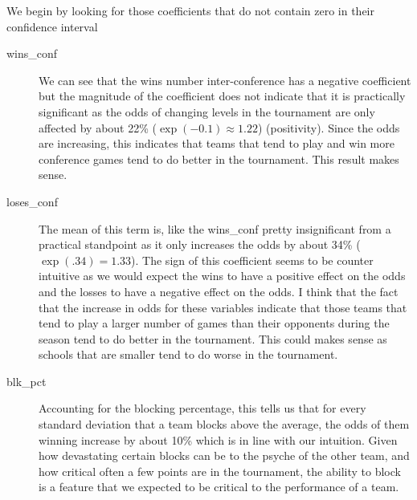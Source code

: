 \documentclass[10pt,a4paper, hidelinks]{article} %
\begin{document}
We begin by looking for those coefficients that do not contain zero in their confidence interval
\begin{description}
	\item[wins\_conf] We can see that the wins number inter-conference has a negative coefficient but the magnitude of the coefficient does not indicate that it is practically significant as the odds of changing levels in the tournament are only affected by about  22\% ($\exp(-0.1) \approx 1.22$) (positivity). Since the odds are increasing, this indicates that teams that tend to play and win more conference games tend to do better in the tournament. This result makes sense. 
	\item[loses\_conf] The mean of this term is, like the wins\_conf pretty insignificant from a practical standpoint as it only increases the odds by about 34\% ($\exp(.34) = 1.33$). The sign of this coefficient seems to be counter intuitive as we would expect the wins to have a positive effect on the odds and the losses to have a negative effect on the odds. I think that the fact that the increase in odds for these variables indicate that those teams that tend to play a larger number of games than their opponents during the season tend to do better in the tournament. This could makes sense as schools that are smaller tend to do worse in the tournament.  
	\item[blk\_pct] Accounting for the blocking percentage, this tells us that for every standard deviation that a team blocks above the average, the odds of them winning increase by about 10\% which is in line with our intuition. Given how devastating certain blocks can be to the psyche of the other team, and how critical often a few points are in the tournament, the ability to block is a feature that we expected to be critical to the performance of a team.
\end{description}
\end{document}
